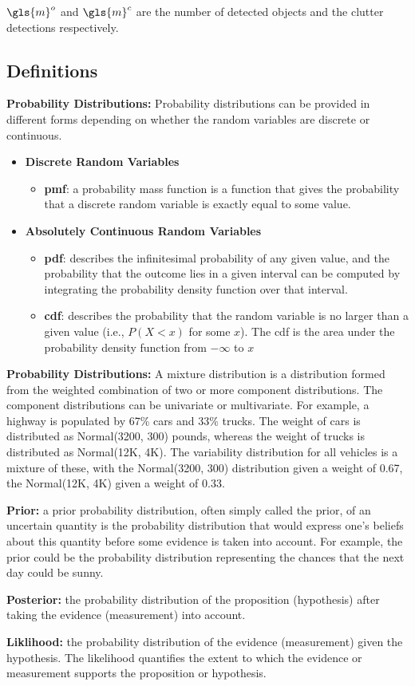 \documentclass[a4paper]{article}
\begin{document}
$\gls{m}^o$ and $\gls{m}^c$ are the number of detected objects and the clutter detections respectively.
\newpage
\begin{appendices}
	\section{Definitions}
	\textbf{Probability Distributions: } Probability distributions can be provided in different forms depending on whether the random variables are discrete or continuous.
	\begin{itemize}
		\item \textbf{Discrete Random Variables}
		\begin{itemize}
			\item \textbf{\acrfull{pmf}}: a probability mass function is a function that gives the probability that a discrete random variable is exactly equal to some value.
		\end{itemize}
		\item \textbf{Absolutely Continuous Random Variables}
		\begin{itemize}
			\item \textbf{\acrfull{pdf}}: describes the infinitesimal probability of any given value, and the probability that the outcome lies in a given interval can be computed by integrating the probability density function over that interval.
			\item \textbf{\acrfull{cdf}}: describes the probability that the random variable is no larger than a given value (i.e., ${\displaystyle P(X<x)}$ for some ${\displaystyle x}$). The \gls{cdf} is the area under the probability density function from ${\displaystyle -\infty }$  to ${\displaystyle x}$
		\end{itemize}
	\end{itemize}
	\textbf{Probability Distributions: }A mixture distribution is a distribution formed from the weighted combination of two or more component distributions. The component distributions can be univariate or multivariate. For example, a highway is populated by 67\% cars and 33\% trucks. The weight of cars is distributed as Normal(3200, 300) pounds, whereas the weight of trucks is distributed as Normal(12K, 4K). The variability distribution for all vehicles is a mixture of these, with the Normal(3200, 300) distribution given a weight of 0.67, the Normal(12K, 4K) given a weight of 0.33.\par\noindent
	\textbf{Prior: }a prior probability distribution, often simply called the prior, of an uncertain quantity is the probability distribution that would express one's beliefs about this quantity before some evidence is taken into account. For example, the prior could be the probability distribution representing the chances that the next day could be sunny.\par\noindent
	\textbf{Posterior: }the probability distribution of the proposition (hypothesis) after taking the evidence (measurement) into account.\par\noindent
	\textbf{Liklihood: }the probability distribution of the evidence (measurement) given the hypothesis. The likelihood quantifies the extent to which the evidence or measurement supports the proposition or hypothesis.
\end{appendices}
\end{document}
